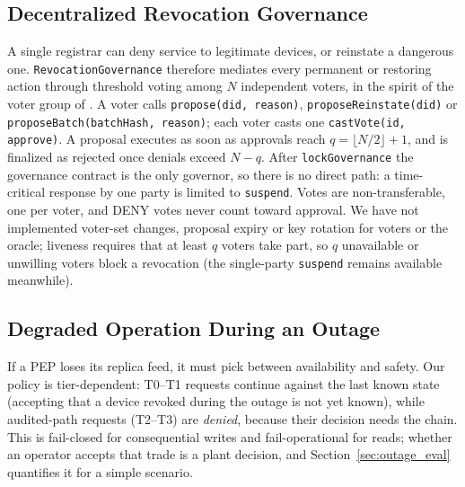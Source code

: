 \subsection{Decentralized Revocation Governance}\label{sec:governance}
A single registrar can deny service to legitimate devices, or reinstate a dangerous one. \texttt{RevocationGovernance} therefore mediates every permanent or restoring action through threshold voting among $N$ independent voters, in the spirit of the voter group of \cite{kumar2026privacy}. A voter calls \texttt{propose(did, reason)}, \texttt{proposeReinstate(did)} or \texttt{proposeBatch(batchHash, reason)}; each voter casts one \texttt{castVote(id, approve)}. A proposal executes as soon as approvals reach $q=\lfloor N/2\rfloor+1$, and is finalized as rejected once denials exceed $N-q$. After \texttt{lockGovernance} the governance contract is the only governor, so there is no direct path: a time-critical response by one party is limited to \texttt{suspend}. Votes are non-transferable, one per voter, and DENY votes never count toward approval. We have not implemented voter-set changes, proposal expiry or key rotation for voters or the oracle; liveness requires that at least $q$ voters take part, so $q$ unavailable or unwilling voters block a revocation (the single-party \texttt{suspend} remains available meanwhile).

\subsection{Degraded Operation During an Outage}\label{sec:outage}
If a PEP loses its replica feed, it must pick between availability and safety. Our policy is tier-dependent: T0--T1 requests continue against the last known state (accepting that a device revoked during the outage is not yet known), while audited-path requests (T2--T3) are \emph{denied}, because their decision needs the chain. This is fail-closed for consequential writes and fail-operational for reads; whether an operator accepts that trade is a plant decision, and Section~\ref{sec:outage_eval} quantifies it for a simple scenario.
